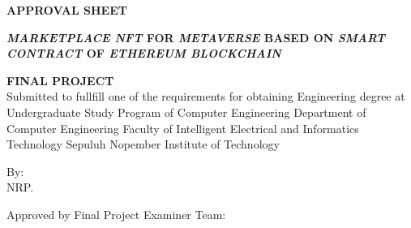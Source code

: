\begin{center}
  \large
  \textbf{APPROVAL SHEET}
\end{center}

\thispagestyle{empty}

\begin{center}
  \textbf{\emph{MARKETPLACE NFT} FOR \emph{METAVERSE} BASED ON \emph{SMART CONTRACT} OF \emph{ETHEREUM BLOCKCHAIN}}
\end{center}

\begingroup
\small


\begin{center}
  \textbf{FINAL PROJECT}
  \\Submitted to fullfill one of the requirements for obtaining Engineering degree at Undergraduate Study Program of Computer Engineering Department of Computer Engineering Faculty of Intelligent Electrical and Informatics Technology Sepuluh Nopember Institute of Technology
\end{center}


\begin{center}
  By: \name{}
  \\NRP. \nrp{}
\end{center}



\begin{center}
  Approved by Final Project Examiner Team:
\end{center}


\begingroup
\setlength{\tabcolsep}{0pt}

